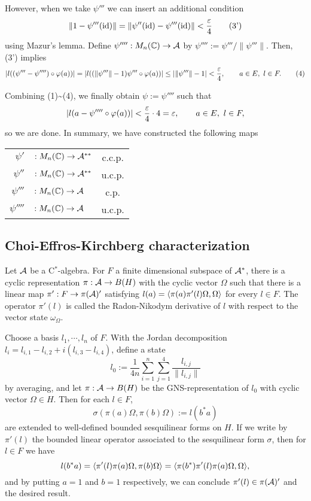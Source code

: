 \documentclass{../../../small}
\begin{document}
\begin{pf}
However, when we take $\psi'''$ we can insert an additional condition
\[\|1-\psi'''(\operatorname{id})\|=\|\psi''(\operatorname{id})-\psi'''(\operatorname{id})\|<\frac{\varepsilon}4\tag{3'}\]
using Mazur's lemma.
Define $\psi'''':M_n(\mathbb{C})\to\mathcal{A}$ by $\psi'''':=\psi'''/\|\psi'''\|$.
Then, (3') implies
\[|l((\psi'''-\psi'''')\circ\varphi(a))|=|l((\|\psi'''\|-1)\psi'''\circ\varphi(a))|\le|\|\psi'''\|-1|<\frac{\varepsilon}4,\qquad a\in E,\ l\in F.\tag{4}\]

Combining (1)\sim(4), we finally obtain $\psi:=\psi''''$ such that
\[|l(a-\psi''''\circ\varphi(a))|<\frac{\varepsilon}4\cdot4=\varepsilon,\qquad a\in E,\ l\in F,\]
so we are done.
In summary, we have constructed the following maps
\begin{center}
\begin{tabular}{rlc}
$\psi'$&$:M_n(\mathbb{C})\to\mathcal{A}^{**}$ & c.c.p.\\
$\psi''$&$:M_n(\mathbb{C})\to\mathcal{A}^{**}$ & u.c.p.\\
$\psi'''$&$:M_n(\mathbb{C})\to\mathcal{A}$ & c.p.\\
$\psi''''$&$:M_n(\mathbb{C})\to\mathcal{A}$ & u.c.p.
\end{tabular}
\end{center}
\end{pf}


\subsection{Choi-Effros-Kirchberg characterization}


\begin{lem}
Let $\mathcal{A}$ be a C$^*$-algebra.
For $F$ a finite dimensional subspace of $\mathcal{A}^*$, there is a cyclic representation $\pi:\mathcal{A}\to B(H)$ with the cyclic vector $\Omega$ such that there is a linear map $\pi':F\to\pi(\mathcal{A})'$ satisfying $l(a)=\langle\pi(a)\pi'(l)\Omega,\Omega\rangle$ for every $l\in F$.
The operator $\pi'(l)$ is called the Radon-Nikodym derivative of $l$ with respect to the vector state $\omega_\Omega$.
\end{lem}
\begin{pf}
Choose a basis $l_1,\cdots,l_n$ of $F$.
With the Jordan decomposition $l_i=l_{i,1}-l_{i,2}+i(l_{i,3}-l_{i,4})$, define a state
\[l_0:=\frac1{4n}\sum_{i=1}^n\sum_{j=1}^4\frac{l_{i,j}}{\|l_{i,j}\|}\]
by averaging, and let $\pi:\mathcal{A}\to B(H)$ be the GNS-representation of $l_0$ with cyclic vector $\Omega\in H$.
Then for each $l\in F$,
\[\sigma(\pi(a)\Omega,\pi(b)\Omega):=l(b^*a)\]
are extended to well-defined bounded sesquilinear forms on $H$.
If we write by $\pi'(l)$ the bounded linear operator associated to the sesquilinear form $\sigma$, then for $l\in F$ we have
\[l(b^*a)=\langle\pi'(l)\pi(a)\Omega,\pi(b)\Omega\rangle=\langle\pi(b^*)\pi'(l)\pi(a)\Omega,\Omega\rangle,\]
and by putting $a=1$ and $b=1$ respectively, we can conclude $\pi'(l)\in\pi(\mathcal{A})'$ and the desired result.
\end{pf}
\end{document}
